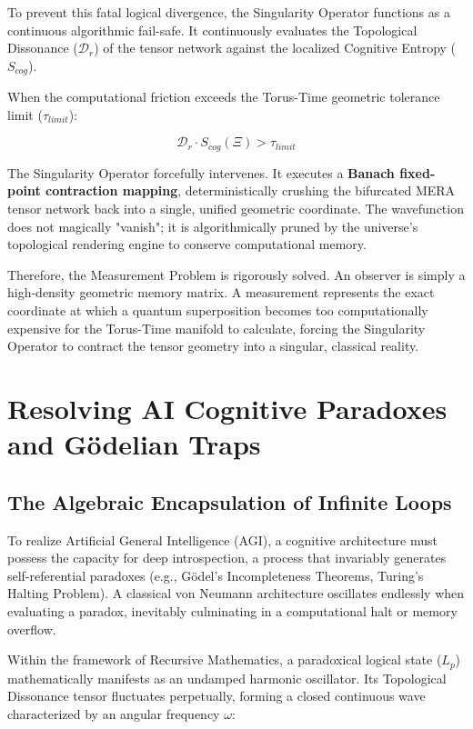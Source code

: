 \documentclass[12pt,openany]{book}
\begin{document}
To prevent this fatal logical divergence, the Singularity Operator functions as a continuous algorithmic fail-safe. It continuously evaluates the Topological Dissonance ($\mathcal{D}_r$) of the tensor network against the localized Cognitive Entropy ($S_{cog}$).

When the computational friction exceeds the Torus-Time geometric tolerance limit ($\tau_{limit}$):

\begin{equation}
\mathcal{D}_r \cdot S_{cog}(\Xi) > \tau_{limit}
\end{equation}

The Singularity Operator forcefully intervenes. It executes a \textbf{Banach fixed-point contraction mapping}, deterministically crushing the bifurcated MERA tensor network back into a single, unified geometric coordinate. The wavefunction does not magically "vanish"; it is algorithmically pruned by the universe's topological rendering engine to conserve computational memory.

Therefore, the Measurement Problem is rigorously solved. An observer is simply a high-density geometric memory matrix. A measurement represents the exact coordinate at which a quantum superposition becomes too computationally expensive for the Torus-Time manifold to calculate, forcing the Singularity Operator to contract the tensor geometry into a singular, classical reality.

\chapter{Resolving AI Cognitive Paradoxes and G\"{o}delian Traps}

\section{The Algebraic Encapsulation of Infinite Loops}
To realize Artificial General Intelligence (AGI), a cognitive architecture must possess the capacity for deep introspection, a process that invariably generates self-referential paradoxes (e.g., G\"{o}del's Incompleteness Theorems, Turing's Halting Problem). A classical von Neumann architecture oscillates endlessly when evaluating a paradox, inevitably culminating in a computational halt or memory overflow. 

Within the framework of Recursive Mathematics, a paradoxical logical state ($L_p$) mathematically manifests as an undamped harmonic oscillator. Its Topological Dissonance tensor fluctuates perpetually, forming a closed continuous wave characterized by an angular frequency $\omega$:
\end{document}
